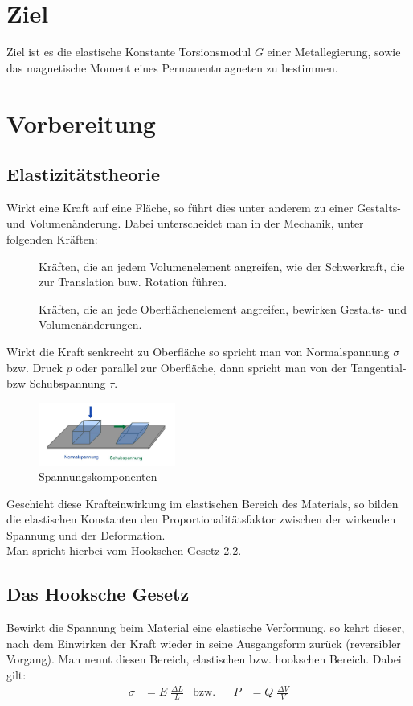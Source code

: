 \section{Ziel}
Ziel ist es die elastische Konstante Torsionsmodul $G$ einer Metallegierung, sowie das magnetische Moment eines Permanentmagneten zu bestimmen.


\section{Vorbereitung}
\subsection{Elastizitätstheorie}
Wirkt eine Kraft auf eine Fläche, so führt dies unter anderem zu einer Gestalts- und Volumenänderung.
Dabei unterscheidet man in der Mechanik, unter folgenden Kräften:
\begin{description}
    \item[]
    Kräften, die an jedem Volumenelement angreifen, wie der Schwerkraft, die zur Translation buw. Rotation führen.
    \item[]
    Kräften, die an jede Oberflächenelement angreifen, bewirken Gestalts- und Volumenänderungen.
\end{description}

Wirkt die Kraft senkrecht zu Oberfläche so spricht man von Normalspannung $\sigma$ bzw. Druck $p$ oder parallel zur Oberfläche,
dann spricht man von der Tangential- bzw Schubspannung $\tau$.
\begin{figure}[h]
  \centering
  \includegraphics[width=0.4\textwidth, height=0.2\textwidth]{bilder/Spannungkomponenten.jpg}
  \caption{Spannungskomponenten}
  \label{fig:Spannungkomponenten}
\end{figure}

Geschieht diese Krafteinwirkung im elastischen Bereich des Materials,
so bilden die elastischen Konstanten den Proportionalitätsfaktor zwischen der
wirkenden Spannung und der Deformation.\\
Man spricht hierbei vom Hookschen Gesetz \ref{sec:Hooksche_Gesetz}.

\subsection{Das Hooksche Gesetz}
\label{sec:Hooksche_Gesetz}
Bewirkt die Spannung beim Material eine elastische Verformung, so kehrt dieser, nach dem Einwirken 
der Kraft wieder in seine Ausgangsform zurück (reversibler Vorgang). Man nennt diesen Bereich, elastischen bzw. hookschen Bereich.
Dabei gilt:
\begin{align}
    \sigma &= E \; \frac{\Delta L}{L} & \mathrm{bzw.} & & P &=Q \;\frac{\Delta V}{V}
\end{align}
\label{eqn:def_hooksche}
\newpage

